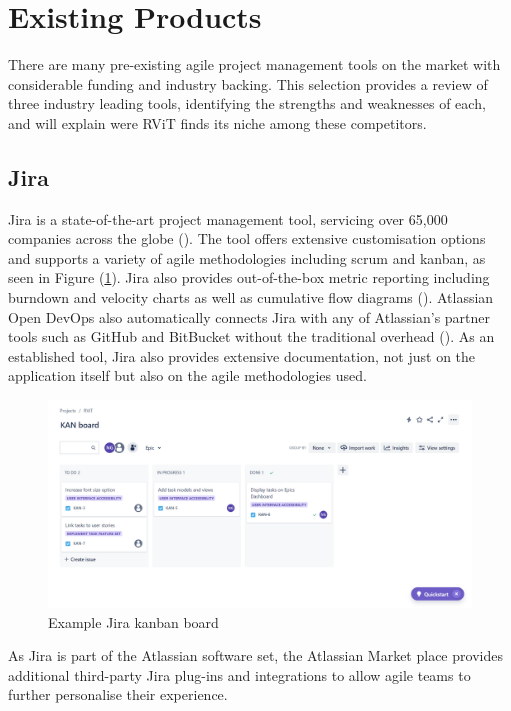 \documentclass[l4proj.tex]{subfiles}
\begin{document}
\section{Existing Products}
There are many pre-existing agile project management tools on the market with considerable funding and industry backing. This selection provides a review of three industry leading tools, identifying the strengths and weaknesses of each, and will explain were RViT finds its niche among these competitors.


\subsection{Jira}
Jira is a state-of-the-art project management tool, servicing over 65,000 companies across the globe (\cite{JiraUsers}). The tool offers extensive customisation options and supports a variety of agile methodologies including scrum and kanban, as seen in Figure (\ref{fig:Jira kanban}).
Jira also provides out-of-the-box metric reporting including burndown and velocity charts as well as cumulative flow diagrams (\cite{JiraReports}). Atlassian Open DevOps also automatically connects Jira with any of Atlassian's partner tools such as GitHub and BitBucket without the traditional overhead (\cite{JiraDevOps}). As an established tool, Jira also provides extensive documentation, not just on the application itself but also on the agile methodologies used.

\begin{figure}[h!]
\begin{center}
\includegraphics[scale=0.32]{dissertation/images/JiraKanbanBoard.png}
\caption{Example Jira kanban board}
\label{fig:Jira kanban} 
\end{center}
\end{figure}

As Jira is part of the Atlassian software set, the Atlassian Market place provides additional third-party Jira plug-ins and integrations to allow agile teams to further personalise their experience.  
\end{document}
